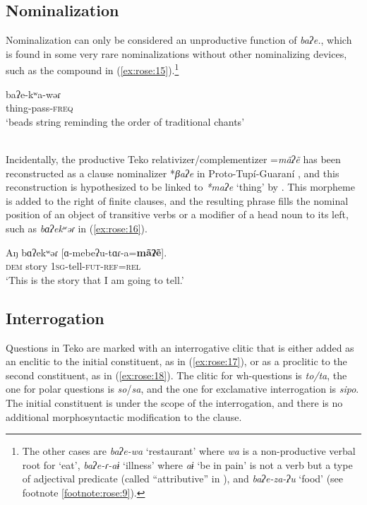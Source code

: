\documentclass[output=paper]{langscibook}
\begin{document}
\subsection{Nominalization}
\label{sec:rose:2.2}
Nominalization can only be considered an unproductive function of \textit{baʔe.}, which is found in some very rare nominalizations without other nominalizing devices, such as the compound in (\ref{ex:rose:15}).\footnote{The other cases are \textit{baʔe-wa} ‘restaurant’ where \textit{wa} is a non-productive verbal root for ‘eat’, \textit{baʔe-ɾ{}-aɨ} ‘illness’ where \textit{aɨ} ‘be in pain’ is not a verb but a type of adjectival predicate (called “attributive” in \citealt[39--51]{Rose2011}), and \textit{baʔe-za-ʔu} ‘food’ (see footnote \ref{footnote:rose:9}).}

\ea \label{ex:rose:15}
\gll baʔe-kʷa-wəɾ\\
thing-pass\textsc{{}-freq}\\
\glt ‘beads string reminding the order of traditional chants’\\ \\
\z

Incidentally, the productive Teko relativizer/complementizer =\textit{mãʔẽ}  \citep[343--354]{Rose2011} has been reconstructed as a clause nominalizer *\textit{βaʔe} in Proto-Tupí-Guaraní \citep[595]{Jensen1998}, and this reconstruction is hypothesized to be linked to \textit{*maʔe} ‘thing’ by \citet[82]{AuweraAuwera2021}. This morpheme is added to the right of finite clauses, and the resulting phrase fills the nominal position of an object of transitive verbs or a modifier of a head noun to its left, such as \textit{bɑʔekʷəɾ} in (\ref{ex:rose:16}).

\ea
\label{ex:rose:16}
\gll Aŋ  bɑʔekʷəɾ\footnotemark{} [ɑ-mebeʔu-tɑɾ-a=\textbf{mãʔẽ}].\\
\textsc{dem}  story  1\textsc{sg}{}-tell-\textsc{fut}{}-\textsc{ref}=\textsc{rel}\\
\glt ‘This is the story that I am going to tell.’ 
\z 
{}  

\subsection{Interrogation}
\label{sec:rose:2.3}
Questions in Teko are marked with an interrogative clitic that is either added as an enclitic to the initial constituent, as in (\ref{ex:rose:17}), or as a proclitic to the second constituent, as in (\ref{ex:rose:18}). The clitic for wh-questions is \textit{to/ta}, the one for polar questions is \textit{so}/\textit{sa}, and the one for exclamative interrogation is \textit{sipo}. The initial constituent is under the scope of the interrogation, and there is no additional morphosyntactic modification to the clause.
\end{document}
